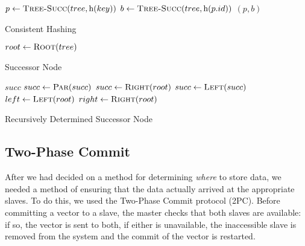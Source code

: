 %
\begin{algorithm}
    \begin{algorithmic}
            \State $p \gets \Call{Tree-Succ}{tree, \func{h}{key}}$
            \State $b \gets \Call{Tree-Succ}{tree, \func{h}{p.id}}$
            \State \Return $(p, b)$
        \EndProcedure
    \end{algorithmic}
    \caption{Consistent Hashing}
    \label{alg:consistent-hashing}
\end{algorithm}
%
\begin{algorithm}
    \begin{algorithmic}
                \State \Return {}
            \Else
                \State $root \gets \Call{Root}{tree}$
                \State \Return {}
            \EndIf
        \EndProcedure
    \end{algorithmic}
    \caption{Successor Node}
    \label{alg:tree-succ}
\end{algorithm}
%
\begin{algorithm}
    \begin{algorithmic}
                \State \Return $succ$
                        \State $succ \gets \Call{Par}{succ}$
                    \EndWhile
                \Else
                    \State $succ \gets \Call{Right}{root}$
                        \State $succ \gets \Call{Left}{succ}$
                    \EndWhile
                \EndIf
                \State $left \gets \Call{Left}{root}$
                \State \Return {}
            \Else
                \State $right \gets \Call{Right}{root}$
                \State \Return {}
            \EndIf
        \EndProcedure
    \end{algorithmic}
    \caption{Recursively Determined Successor Node}
    \label{alg:recur-succ}
\end{algorithm}
%
\subsection{Two-Phase Commit}
After we had decided on a method for determining \emph{where} to store data,
we needed a method of ensuring that the data actually arrived at the
appropriate slaves. To do this, we used the Two-Phase Commit protocol (2PC).
Before committing a vector to a slave, the master checks that both slaves are
available: if so, the vector is sent to both, if either is unavailable, the
inaccessible slave is removed from the system and the commit of the vector is
restarted. \cite{tanenbaum2017}
%
